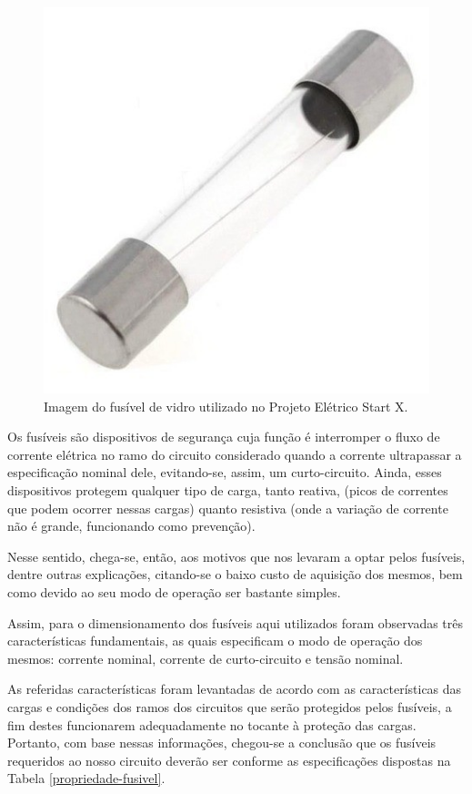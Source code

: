 \begin{figure}[h]
	\centering
	\includegraphics[scale=0.2]		{figuras/fusivel.png}
	\caption{Imagem do fusível de vidro utilizado no Projeto Elétrico Start X.}
	\label{fusivel}
\end{figure}

Os fusíveis são dispositivos de segurança cuja função é interromper o fluxo de corrente elétrica no ramo do circuito considerado quando a corrente ultrapassar a especificação nominal dele, evitando-se, assim, um curto-circuito. Ainda, esses dispositivos protegem qualquer tipo de carga, tanto reativa, (picos de correntes que podem ocorrer nessas cargas) quanto resistiva (onde a variação de corrente não é grande, funcionando como prevenção).

Nesse sentido, chega-se, então, aos motivos que nos levaram a optar pelos fusíveis, dentre outras explicações, citando-se o baixo custo de aquisição dos mesmos, bem como devido ao seu modo de operação ser bastante simples. 

Assim, para o dimensionamento dos fusíveis aqui utilizados foram observadas três características fundamentais, as quais especificam o modo de operação dos mesmos: corrente nominal, corrente de curto-circuito e tensão nominal. 

As referidas características foram levantadas de acordo com as características das cargas e condições dos ramos dos circuitos que serão protegidos pelos fusíveis, a fim destes funcionarem adequadamente no tocante à proteção das cargas. Portanto, com base nessas informações, chegou-se a conclusão que os fusíveis requeridos ao nosso circuito deverão ser conforme as especificações dispostas na Tabela \ref{propriedade-fusivel}.
 	
